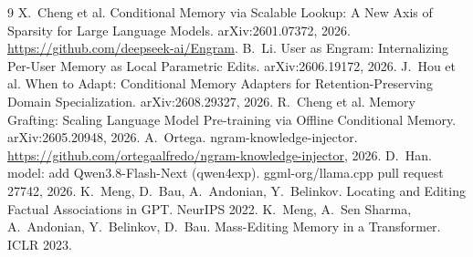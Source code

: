 \documentclass[10pt,a4paper]{article}
\begin{document}
\begin{thebibliography}{9}\small
{} X.~Cheng et al. Conditional Memory via Scalable Lookup: A New Axis of
Sparsity for Large Language Models. arXiv:2601.07372, 2026.
\url{https://github.com/deepseek-ai/Engram}.
 B.~Li. User as Engram: Internalizing Per-User Memory as Local
Parametric Edits. arXiv:2606.19172, 2026.
 J.~Hou et al. When to Adapt: Conditional Memory Adapters for
Retention-Preserving Domain Specialization. arXiv:2608.29327, 2026.
 R.~Cheng et al. Memory Grafting: Scaling Language Model
Pre-training via Offline Conditional Memory. arXiv:2605.20948, 2026.
 A.~Ortega. ngram-knowledge-injector.
\url{https://github.com/ortegaalfredo/ngram-knowledge-injector}, 2026.
 D.~Han. model: add Qwen3.8-Flash-Next (qwen4exp). ggml-org/llama.cpp
pull request 27742, 2026.
 K.~Meng, D.~Bau, A.~Andonian, Y.~Belinkov. Locating and Editing Factual
Associations in GPT. NeurIPS 2022.
 K.~Meng, A.~Sen Sharma, A.~Andonian, Y.~Belinkov, D.~Bau. Mass-Editing
Memory in a Transformer. ICLR 2023.
\end{thebibliography}
\end{document}
